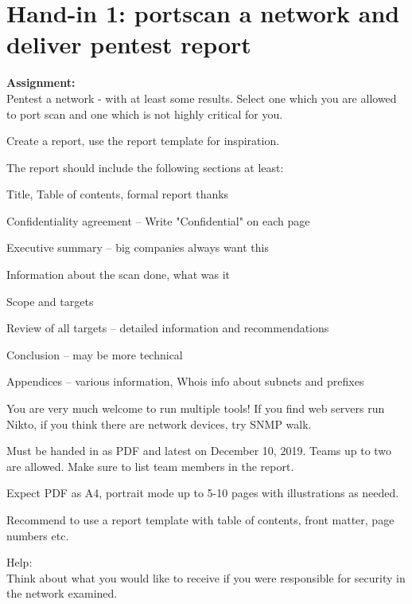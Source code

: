 \documentclass[a4paper,11pt,notitlepage]{report}
\begin{document}
\rm
{}

\newcommand{\course}[1]{KEA Kompetence Penetration Testing 2019\\ exercises}




\setcounter{tocdepth}{0}

\normal



\chapter*{Hand-in 1: portscan a network and deliver pentest report}

{\bf Assignment:}\\
Pentest a network - with at least some results. Select one which you are allowed to port scan and one which is not highly critical for you.

Create a report, use the report template for inspiration.

The report should include the following sections at least:
\begin{list2}
\item Title, Table of contents, formal report thanks
\item Confidentiality agreement -- Write "Confidential" on each page
\item Executive summary -- big companies always want this
\item Information about the scan done, what was it
\item Scope and targets
\item Review of all targets -- detailed information and recommendations
\item Conclusion -- may be more technical
\item Appendices -- various information, Whois info about subnets and prefixes
\end{list2}

You are very much welcome to run multiple tools! If you find web servers run Nikto, if you think there are network devices, try SNMP walk.

Must be handed in as PDF and latest on December 10, 2019. Teams up to two are allowed. Make sure to list team members in the report.

Expect PDF as A4, portrait mode up to 5-10 pages with illustrations as needed.

Recommend to use a report template with table of contents, front matter, page numbers etc.


Help:\\
Think about what you would like to receive if you were responsible for security in the network examined.
\end{document}
